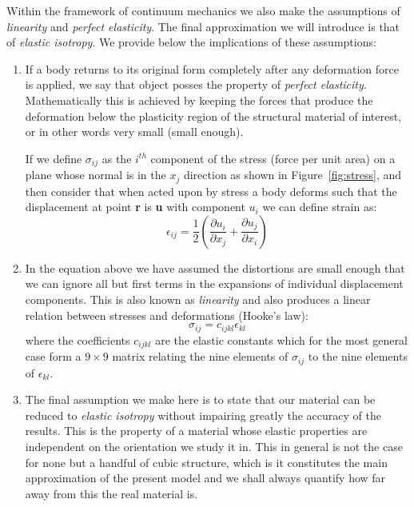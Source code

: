 Within the framework of continuum mechanics we also make the assumptions of \textit{linearity} and \textit{perfect elasticity}. The final approximation we will introduce is that of \textit{elastic isotropy}. We provide below the implications of these assumptions:
\begin{enumerate}
\item If a body returns to its original form completely after any deformation force is applied, we say that object posses the property of \textit{perfect elasticity}. Mathematically this is achieved by keeping the forces that produce the deformation below the plasticity region of the structural material of interest, or in other words very small (small enough).

If we define $\sigma_{ij}$ as the $i^{th}$ component of the stress (force per unit area) on a plane whose normal is in the $x_{j}$ direction as shown in Figure~\ref{fig:stress}, and then consider that when acted upon by stress a body deforms such that the displacement at point \textbf{r} is \textbf{u} with component $u_{i}$ we can define strain as:
\begin{equation}
\label{eq:epsilon}
\epsilon_{ij}=\dfrac{1}{2}\left(\dfrac{\partial u_i}{\partial x_j} + \dfrac{\partial u_j}{\partial x_i}\right)
\end{equation}

\item In the equation above we have assumed the distortions are small enough that we can ignore all but first terms in the expansions of individual displacement components. This is also known as \textit{linearity} and also produces a linear relation between stresses and deformations (Hooke's law):
\begin{equation}
\label{eq:sigma}
\sigma_{ij}=c_{ijkl}\epsilon_{kl}
\end{equation}
where the coefficients $c_{ijkl}$ are the elastic constants which for the most general case form a $9\times9$ matrix relating the nine elements of $\sigma_{ij}$ to the nine elements of $\epsilon_{kl}$.

\item The final assumption we make here is to state that our material can be reduced to \textit{elastic isotropy} without impairing greatly the accuracy of the results. This is the property of a material whose elastic properties are independent on the orientation we study it in. This in general is not the case for none but a handful of cubic structure, which is it constitutes the main approximation of the present model and we shall always quantify how far away from this the real material is.
\end{enumerate}

